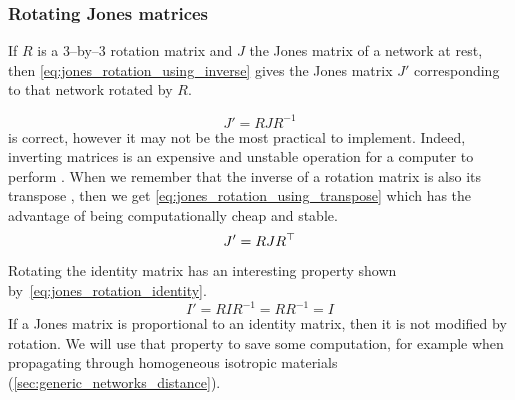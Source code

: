 \subsubsection{Rotating Jones matrices}
\label{sec:rotating_jones_matrices}
If $R$ is a 3--by--3 rotation matrix and $J$ the Jones matrix of a network at rest,
then \cref{eq:jones_rotation_using_inverse} gives the Jones matrix $J'$ corresponding to that network rotated by $R$.

\begin{equation}
    J' = R J R^{-1}
    \label{eq:jones_rotation_using_inverse}
\end{equation}
 is correct, however it may not be the most practical to implement.
Indeed, inverting matrices is an expensive and unstable operation for a computer to perform%
.
When we remember that the inverse of a rotation matrix is also its transpose%
,
then we get \cref{eq:jones_rotation_using_transpose} which has the advantage of being computationally cheap and stable.
\begin{equation}
    J' = R J R^\top
    \label{eq:jones_rotation_using_transpose}
\end{equation}

Rotating the identity matrix has an interesting property shown by~\eqref{eq:jones_rotation_identity}.
\begin{equation}
    I' = R I R^{-1}
       = R R^{-1}
       = I
    \label{eq:jones_rotation_identity}
\end{equation}
If a Jones matrix is proportional to an identity matrix, then it is not modified by rotation.
We will use that property to save some computation, for example when propagating through homogeneous isotropic materials (\vref{sec:generic_networks_distance}).




